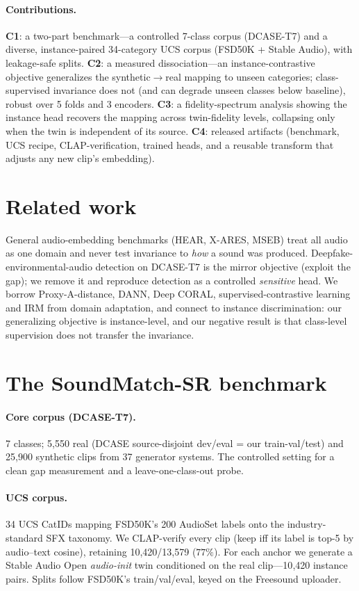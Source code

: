 \documentclass[11pt]{article}
\begin{document}
\paragraph{Contributions.}
\textbf{C1}: a two-part benchmark---a controlled 7-class corpus (DCASE-T7) and a diverse,
instance-paired 34-category UCS corpus (FSD50K + Stable Audio), with leakage-safe splits.
\textbf{C2}: a measured dissociation---an instance-contrastive objective generalizes the
synthetic$\to$real mapping to unseen categories; class-supervised invariance does not (and can
degrade unseen classes below baseline), robust over 5 folds and 3 encoders.
\textbf{C3}: a fidelity-spectrum analysis showing the instance head recovers the mapping across
twin-fidelity levels, collapsing only when the twin is independent of its source.
\textbf{C4}: released artifacts (benchmark, UCS recipe, CLAP-verification, trained heads, and a
reusable transform that adjusts any new clip's embedding).

\section{Related work}
General audio-embedding benchmarks (HEAR, X-ARES, MSEB) treat all audio as one domain and never
test invariance to \emph{how} a sound was produced. Deepfake-environmental-audio detection on
DCASE-T7 is the mirror objective (exploit the gap); we remove it and reproduce detection as a
controlled \emph{sensitive} head. We borrow Proxy-A-distance, DANN, Deep CORAL,
supervised-contrastive learning and IRM from domain adaptation, and connect to instance
discrimination: our generalizing objective is instance-level, and our negative result is that
class-level supervision does not transfer the invariance.

\section{The SoundMatch-SR benchmark}
\paragraph{Core corpus (DCASE-T7).} 7 classes; 5{,}550 real (DCASE source-disjoint dev/eval =
our train-val/test) and 25{,}900 synthetic clips from 37 generator systems. The controlled
setting for a clean gap measurement and a leave-one-class-out probe.
\paragraph{UCS corpus.} 34 UCS CatIDs mapping FSD50K's 200 AudioSet labels onto the
industry-standard SFX taxonomy. We CLAP-verify every clip (keep iff its label is top-5 by
audio--text cosine), retaining 10{,}420/13{,}579 ($77\%$). For each anchor we generate a Stable
Audio Open \emph{audio-init} twin conditioned on the real clip---10{,}420 instance pairs. Splits
follow FSD50K's train/val/eval, keyed on the Freesound uploader.
\end{document}
